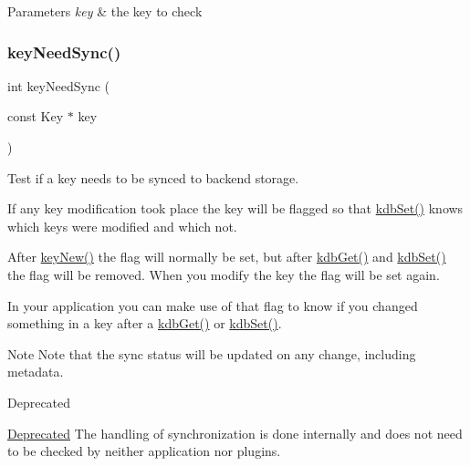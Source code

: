 \begin{DoxyParams}{Parameters}
{\em key} & the key to check \\
\hline
\end{DoxyParams}
\mbox{\label{group__keytest_gaf247df0de7aca04b32ef80e39ef12950}} 
\subsubsection{\texorpdfstring{keyNeedSync()}{keyNeedSync()}}
{\footnotesize\ttfamily int key\+Need\+Sync (\begin{DoxyParamCaption}\item[{const Key $\ast$}]{key }\end{DoxyParamCaption})}



Test if a key needs to be synced to backend storage. 

If any key modification took place the key will be flagged so that \mbox{\hyperlink{group__kdb_ga11436b058408f83d303ca5e996832bcf}{kdb\+Set()}} knows which keys were modified and which not.

After \mbox{\hyperlink{group__key_gad23c65b44bf48d773759e1f9a4d43b89}{key\+New()}} the flag will normally be set, but after \mbox{\hyperlink{group__kdb_ga28e385fd9cb7ccfe0b2f1ed2f62453a1}{kdb\+Get()}} and \mbox{\hyperlink{group__kdb_ga11436b058408f83d303ca5e996832bcf}{kdb\+Set()}} the flag will be removed. When you modify the key the flag will be set again.

In your application you can make use of that flag to know if you changed something in a key after a \mbox{\hyperlink{group__kdb_ga28e385fd9cb7ccfe0b2f1ed2f62453a1}{kdb\+Get()}} or \mbox{\hyperlink{group__kdb_ga11436b058408f83d303ca5e996832bcf}{kdb\+Set()}}.

\begin{DoxyNote}{Note}
Note that the sync status will be updated on any change, including metadata.
\end{DoxyNote}
\begin{DoxyRefDesc}{Deprecated}
\item[\mbox{\hyperlink{deprecated__deprecated000012}{Deprecated}}]The handling of synchronization is done internally and does not need to be checked by neither application nor plugins.\end{DoxyRefDesc}


